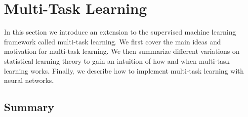 \chapter{Multi-Task Learning}
\label{multi-task_learning}
In this section we introduce an extension to the supervised machine learning framework called multi-task learning. We first cover the main ideas and motivation for multi-task learning. We then summarize different variations on statistical learning theory to gain an intuition of how and when multi-task learning works. Finally, we describe how to implement multi-task learning with neural networks.







\section{Summary}